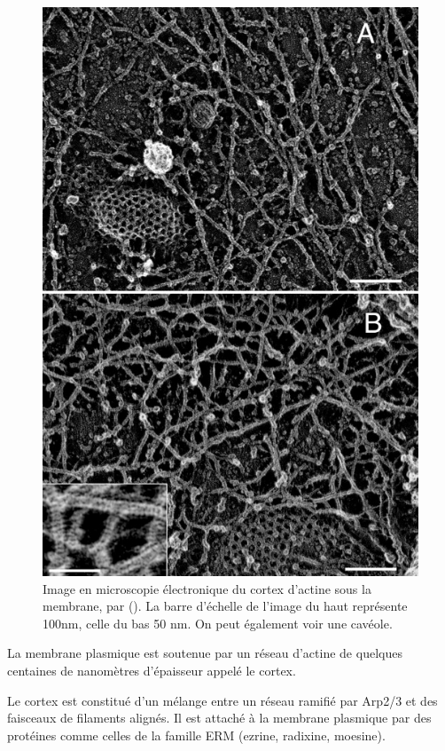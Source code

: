 \begin{figure}
\includegraphics[scale=0.25]{Figures/cortex.png} 
\caption{Image en microscopie électronique du cortex d'actine sous la membrane, par (\cite{morone_three-dimensional_2006}). La barre d'échelle de l'image du haut représente 100nm, celle du bas 50 nm. On peut également voir une cavéole.}
\end{figure}

La membrane plasmique est soutenue par un réseau d'actine de quelques centaines de nanomètres d'épaisseur appelé le cortex.

Le cortex est constitué d'un mélange entre un réseau ramifié par Arp2/3 et des faisceaux de filaments alignés. 
Il est attaché à la membrane plasmique par des protéines comme celles de la famille ERM (ezrine, radixine, moesine). 

